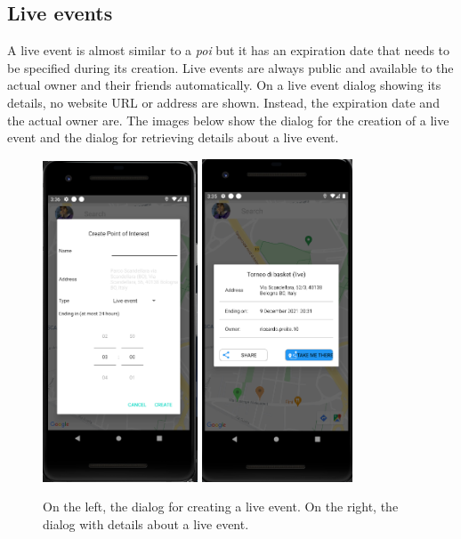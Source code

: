 \documentclass[../../main]{subfiles}
\begin{document}
\subsection{Live events}
\label{ss:final-live}

A live event is almost similar to a \textit{poi} but it has an expiration date that needs to be specified during its creation.
Live events are always public and available to the actual owner and their friends automatically.
On a live event dialog showing its details, no website URL or address are shown.
Instead, the expiration date and the actual owner are.
The images below show the dialog for the creation of a live event and the dialog for retrieving details about a live event.
\begin{figure}[H]
    \centering
    \includegraphics[width=0.41\textwidth]{images/app/live/creazione_live}
    \includegraphics[width=0.4\textwidth]{images/app/live/live_map_detail}
    \caption{On the left, the dialog for creating a live event. On the right, the dialog with details about a live event.}
\end{figure}
\end{document}
